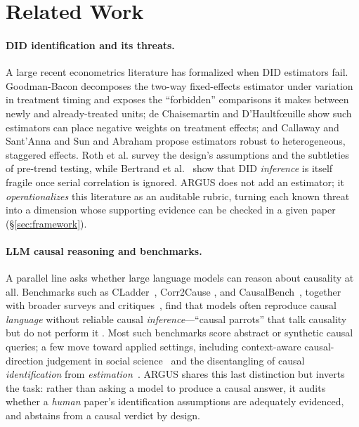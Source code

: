 \section{Related Work}
\label{sec:related}

\paragraph{DID identification and its threats.}
A large recent econometrics literature has formalized when DID estimators fail.
Goodman-Bacon \cite{goodmanbacon2021} decomposes the two-way fixed-effects
estimator under variation in treatment timing and exposes the ``forbidden''
comparisons it makes between newly and already-treated units; de Chaisemartin and
D'Haultf{\oe}uille \cite{dechaisemartin2020} show such estimators can place
negative weights on treatment effects; and Callaway and Sant'Anna
\cite{callaway2021} and Sun and Abraham \cite{sunabraham2021} propose estimators
robust to heterogeneous, staggered effects. Roth et al. \cite{roth2023} survey
the design's assumptions and the subtleties of pre-trend testing, while Bertrand
et al.~\cite{bertrand2004trust} show that DID \emph{inference} is itself fragile
once serial correlation is ignored. ARGUS does not
add an estimator; it \emph{operationalizes} this literature as an auditable
rubric, turning each known threat into a dimension whose supporting evidence can
be checked in a given paper (\S\ref{sec:framework}).

\paragraph{LLM causal reasoning and benchmarks.}
A parallel line asks whether large language models can reason about causality at
all. Benchmarks such as CLadder~\cite{jin2023cladder}, Corr2Cause
\cite{jin2024corr2cause}, and CausalBench~\cite{zhou2024causalbench}, together
with broader surveys and critiques~\cite{kiciman2023causal,yang2024criticalreview},
find that models often reproduce causal \emph{language} without reliable causal
\emph{inference}---``causal parrots'' that talk causality but do not perform it
\cite{zecevic2023causalparrots}. Most such benchmarks score abstract or synthetic
causal queries; a few move toward applied settings, including context-aware
causal-direction judgement in social science~\cite{lee2025econcausal} and the
disentangling of causal \emph{identification} from
\emph{estimation}~\cite{sawarni2026causalreasoning}.
ARGUS shares this last distinction but inverts the task: rather than asking a model
to produce a causal answer, it audits whether a \emph{human} paper's
identification assumptions are adequately evidenced, and abstains from a causal
verdict by design.

